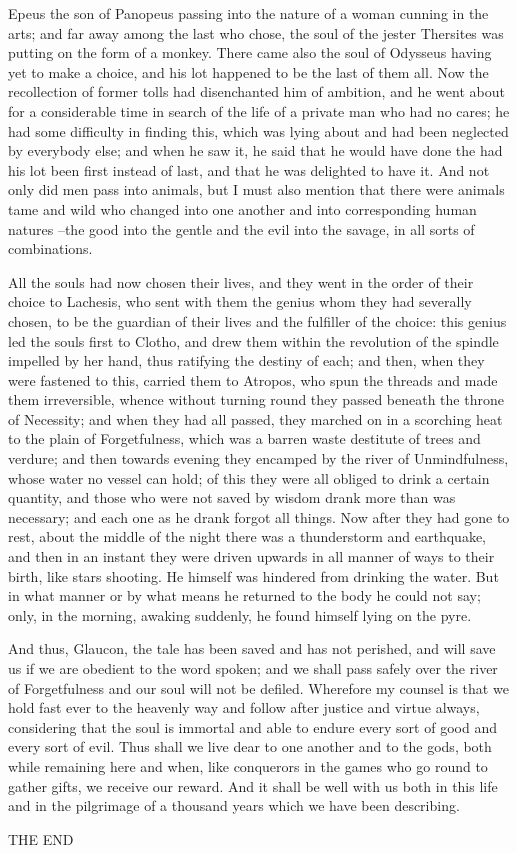 Epeus the son of Panopeus passing into the nature of a woman cunning in the arts; and far away among the last who chose, the soul of the jester Thersites was putting on the form of a monkey. There came also the soul of Odysseus having yet to make a choice, and his lot happened to be the last of them all. Now the recollection of former tolls had disenchanted him of ambition, and he went about for a considerable time in search of the life of a private man who had no cares; he had some difficulty in finding this, which was lying about and had been neglected by everybody else; and when he saw it, he said that he would have done the had his lot been first instead of last, and that he was delighted to have it. And not only did men pass into animals, but I must also mention that there were animals tame and wild who changed into one another and into corresponding human natures --the good into the gentle and the evil into the savage, in all sorts of combinations.

All the souls had now chosen their lives, and they went in the order of their choice to Lachesis, who sent with them the genius whom they had severally chosen, to be the guardian of their lives and the fulfiller of the choice: this genius led the souls first to Clotho, and drew them within the revolution of the spindle impelled by her hand, thus ratifying the destiny of each; and then, when they were fastened to this, carried them to Atropos, who spun the threads and made them irreversible, whence without turning round they passed beneath the throne of Necessity; and when they had all passed, they marched on in a scorching heat to the plain of Forgetfulness, which was a barren waste destitute of trees and verdure; and then towards evening they encamped by the river of Unmindfulness, whose water no vessel can hold; of this they were all obliged to drink a certain quantity, and those who were not saved by wisdom drank more than was necessary; and each one as he drank forgot all things. Now after they had gone to rest, about the middle of the night there was a thunderstorm and earthquake, and then in an instant they were driven upwards in all manner of ways to their birth, like stars shooting. He himself was hindered from drinking the water. But in what manner or by what means he returned to the body he could not say; only, in the morning, awaking suddenly, he found himself lying on the pyre.

And thus, Glaucon, the tale has been saved and has not perished, and will save us if we are obedient to the word spoken; and we shall pass safely over the river of Forgetfulness and our soul will not be defiled. Wherefore my counsel is that we hold fast ever to the heavenly way and follow after justice and virtue always, considering that the soul is immortal and able to endure every sort of good and every sort of evil. Thus shall we live dear to one another and to the gods, both while remaining here and when, like conquerors in the games who go round to gather gifts, we receive our reward. And it shall be well with us both in this life and in the pilgrimage of a thousand years which we have been describing.


THE END